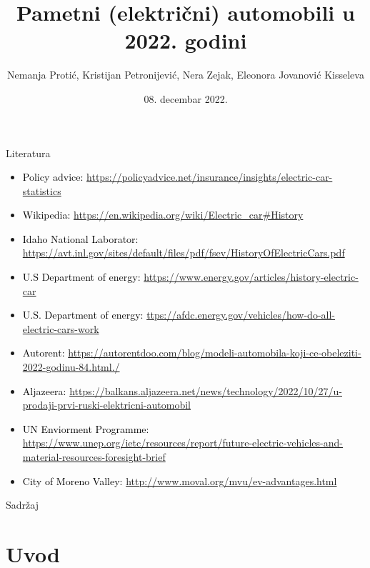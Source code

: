 \documentclass[11pt]{beamer}
\author{Nemanja Protić, Kristijan Petronijević, Nera Zejak, Eleonora Jovanović Kisseleva}
\title{Pametni (električni) automobili u 2022. godini}
\institute[]{Matematički fakultet Univertziteta u Beogradu}
\date{08. decembar 2022.}
\begin{document}
\begin{frame}
\titlepage
\end{frame}

\begin{frame}{Literatura}
\begin{itemize}

\item \textcolor{black}{{\footnotesize Policy advice:}} {\footnotesize \url{ https://policyadvice.net/insurance/insights/electric-car-statistics}}
\item \textcolor{black}{{\footnotesize Wikipedia:}} {\footnotesize \url{ https://en.wikipedia.org/wiki/Electric_car#History}}
\item \textcolor{black}{{\footnotesize Idaho National Laborator:}} {\footnotesize \url{  https://avt.inl.gov/sites/default/files/pdf/fsev/HistoryOfElectricCars.pdf}}
\item \textcolor{black}{{\footnotesize U.S Department of energy:}} {\footnotesize \url{  https://www.energy.gov/articles/history-electric-car}}
\item \textcolor{black}{{\footnotesize U.S. Department of energy:}} {\footnotesize \url{ttps://afdc.energy.gov/vehicles/how-do-all-electric-cars-work }}
\item \textcolor{black}{{\footnotesize Autorent:}} {\footnotesize \url{ https://autorentdoo.com/blog/modeli-automobila-koji-ce-obeleziti-2022-godinu-84.html./}}
\item \textcolor{black}{{\footnotesize Aljazeera:}} {\footnotesize \url{ https://balkans.aljazeera.net/news/technology/2022/10/27/u-prodaji-prvi-ruski-elektricni-automobil}}
\item \textcolor{black}{{\footnotesize UN Enviorment Programme:}} {\footnotesize \url{ https://www.unep.org/ietc/resources/report/future-electric-vehicles-and-material-resources-foresight-brief}}
\item \textcolor{black}{{\footnotesize City of Moreno Valley:}} {\footnotesize \url{ http://www.moval.org/mvu/ev-advantages.html}}
\end{itemize}
\end{frame}

\begin{frame}{Sadržaj}
\tableofcontents 
\end{frame}

\section{Uvod}
\end{document}
